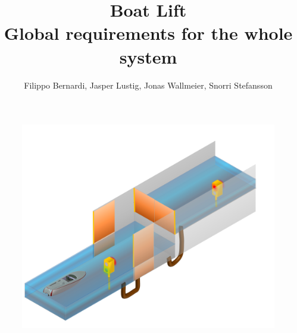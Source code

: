 \documentclass{article}
\begin{document}
\title{\huge{Boat Lift} \\ {\fontsize{13}{1} \selectfont Global requirements for the whole system} }
\author{Filippo Bernardi, Jasper Lustig, Jonas Wallmeier, Snorri Stefansson}

\maketitle



\begin{figure}[!h]
	\includegraphics[width=\linewidth]{New}
\end{figure}

\pagebreak

%







\end{document}
